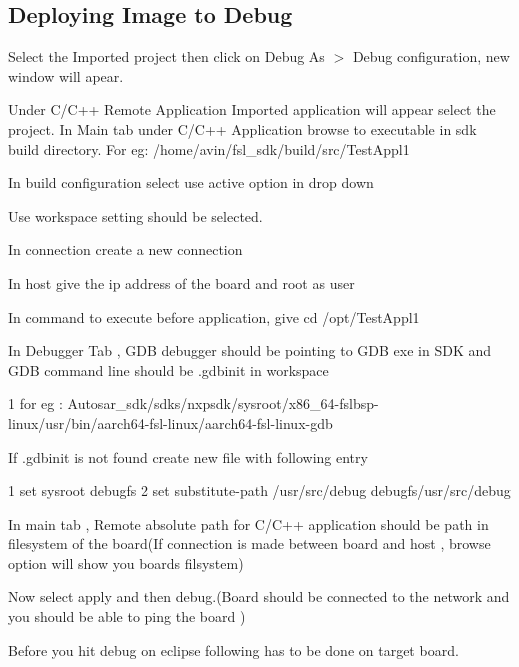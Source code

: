 \subsection*{Deploying Image to Debug}


\begin{DoxyItemize}
\item Select the Imported project then click on Debug As $>$ Debug configuration, new window will apear.
\item Under C/\+C++ Remote Application Imported application will appear select the project. In Main tab under C/\+C++ Application browse to executable in sdk build directory. For eg\+: /home/avin/fsl\+\_\+sdk/build/src/\+Test\+Appl1  
\item In build configuration select use active option in drop down
\item Use workspace setting should be selected.
\item In connection create a new connection 
\item In host give the ip address of the board and root as user
\item In command to execute before application, give cd /opt/\+Test\+Appl1
\item In Debugger Tab , G\+DB debugger should be pointing to G\+DB exe in S\+DK and G\+DB command line should be .gdbinit in workspace 
\begin{DoxyCode}
1 for eg :
       Autosar\_sdk/sdks/nxpsdk/sysroot/x86\_64-fslbsp-linux/usr/bin/aarch64-fsl-linux/aarch64-fsl-linux-gdb
\end{DoxyCode}

\end{DoxyItemize}




\begin{DoxyItemize}
\item If .gdbinit is not found create new file with following entry 
\begin{DoxyCode}
1 set sysroot debugfs
2 set substitute-path /usr/src/debug debugfs/usr/src/debug
\end{DoxyCode}

\item In main tab , Remote absolute path for C/\+C++ application should be path in filesystem of the board(\+If connection is made between board and host , browse option will show you boards filsystem)
\item Now select apply and then debug.(Board should be connected to the network and you should be able to ping the board )
\item Before you hit debug on eclipse following has to be done on target board.
\end{DoxyItemize}

